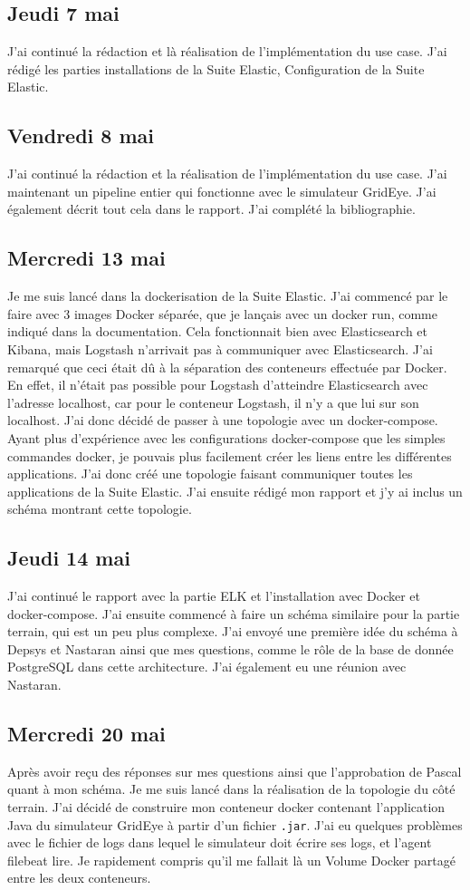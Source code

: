 \documentclass[paper=a4, fontsize=11pt]{scrartcl}
\begin{document}
\subsection{Jeudi 7 mai}
    J'ai continué la rédaction et là réalisation de l'implémentation du use case. J'ai rédigé les parties installations de la Suite Elastic, Configuration de la Suite Elastic.
\subsection{Vendredi 8 mai}
    J'ai continué la rédaction et la réalisation de l'implémentation du use case. J'ai maintenant un pipeline entier qui fonctionne avec le simulateur GridEye. J'ai également décrit tout cela dans le rapport. J'ai complété la bibliographie.
\subsection{Mercredi 13 mai}
    Je me suis lancé dans la dockerisation de la Suite Elastic. J'ai commencé par le faire avec 3 images Docker séparée, que je lançais avec un docker run, comme indiqué dans la documentation. Cela fonctionnait bien avec Elasticsearch et Kibana, mais Logstash n'arrivait pas à communiquer avec Elasticsearch. J'ai remarqué que ceci était dû à la séparation des conteneurs effectuée par Docker. En effet, il n'était pas possible pour Logstash d'atteindre Elasticsearch avec l'adresse localhost, car pour le conteneur Logstash, il n'y a que lui sur \og son \fg localhost. J'ai donc décidé de passer à une topologie avec un docker-compose. Ayant plus d'expérience avec les configurations docker-compose que les simples commandes docker, je pouvais plus facilement créer les liens entre les différentes applications. J'ai donc créé une topologie faisant communiquer toutes les applications de la Suite Elastic. J'ai ensuite rédigé mon rapport et j'y ai inclus un schéma montrant cette topologie.
\subsection{Jeudi 14 mai}
    J'ai continué le rapport avec la partie ELK et l'installation avec Docker et docker-compose. J'ai ensuite commencé à faire un schéma similaire pour la partie terrain, qui est un peu plus complexe. J'ai envoyé une première idée du schéma à Depsys et Nastaran ainsi que mes questions, comme le rôle de la base de donnée PostgreSQL dans cette architecture. J'ai également eu une réunion avec Nastaran.
\subsection{Mercredi 20 mai}
    Après avoir reçu des réponses sur mes questions ainsi que l'approbation de Pascal quant à mon schéma. Je me suis lancé dans la réalisation de la topologie du côté terrain. J'ai décidé de construire mon conteneur docker contenant l'application Java du simulateur GridEye à partir d'un fichier \verb,.jar,. J'ai eu quelques problèmes avec le fichier de logs dans lequel le simulateur doit écrire ses logs, et l'agent filebeat lire. Je rapidement compris qu'il me fallait là un Volume Docker partagé entre les deux conteneurs.
\end{document}
